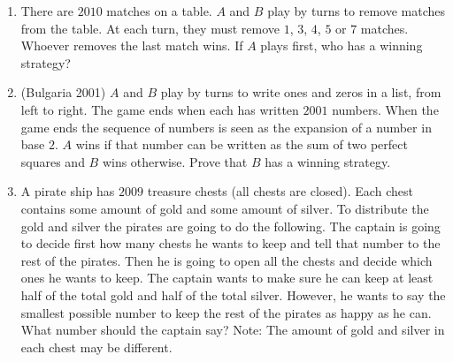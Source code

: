\documentclass[12pt]{scrartcl}
\begin{document}
\begin{enumerate}[resume]
\item There are $2010$ matches on a table. $A$ and $B$ play by turns to remove matches from the table. At each turn, they must remove $1$, $3$, $4$, $5$ or $7$ matches. Whoever removes the last match wins. If $A$ plays first, who has a winning strategy?

\item (Bulgaria 2001) $A$ and $B$ play by turns to write ones and zeros in a list, from left to right. The game ends when each has written $2001$ numbers. When the game ends the sequence of numbers is seen as the expansion of a number in base $2$. $A$ wins if that number can be written as the sum of two perfect squares and $B$ wins otherwise. Prove that $B$ has a winning strategy.

\item A pirate ship has $2009$ treasure chests (all chests are closed). Each chest contains some amount of gold and some amount of silver. To distribute the gold and silver the pirates are going to do the following. The captain is going to decide first how many chests he wants to keep and tell that number to the rest of the pirates. Then he is going to open all the chests and decide which ones he wants to keep. The captain wants to make sure he can keep at least half of the total gold and half of the total silver. However, he wants to say the smallest possible number to keep the rest of the pirates as happy as he can. What number should the captain say? Note: The amount of gold and silver in each chest may be different.
\end{enumerate}
\end{document}
